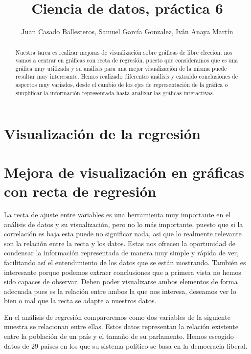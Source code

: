 \documentclass [a4paper] {article}
\title{Ciencia de datos, práctica 6}
\author{Juan Casado Ballesteros, Samuel García Gonzalez, Iván Anaya Martín}
\begin{document}
\maketitle

\begin{abstract}
Nuestra tarea es realizar mejoras de visualización sobre gráficas de libre elección. nos vamos a centrar en gráficas con recta de regresión, puesto 
que consideramos que es una gráfica muy utilizada y su análisis para una mejor visualización de la misma puede resultar muy interesante. 
Hemos realizado diferentes análisis y extraido conclusiones de aspectos muy variados, desde el cambio de los ejes de representación de la gráfica o 
simplificar la información representada hasta analizar las gráficas interactivas.

\end{abstract}

\newpage
\tableofcontents


\newpage
\section{Visualización de la regresión}


\section{Mejora de visualización en gráficas con recta de regresión}
La recta de ajuste entre variables es una herramienta muy importante en el análisis de datos y su visualización, pero no lo más importante, puesto que 
si la correlación es baja esta puede no significar nada, asi que lo realmente relevante son la relación entre la recta y los datos. 
Estas nos ofrecen la oportunidad de condensar la información representada de manera muy simple y rápida de ver, facilitando así 
el entendimiento de los datos que se están mostrando. También es interesante porque podemos extraer conclusiones que 
a primera vista no hemos sido capaces de observar. 
Deben poder visualizarse ambos elementos de forma adecuada pues es la relación entre ambos la que nos interesa, deseamos ver lo bien o mal que la recta se adapte a nuestros datos.

En el análisis de regresión compareremos como dos variables de la siguiente muestra se relacionan entre ellas.
Estos datos representan la relación existente entre la población de un país y el tamaño de su parlamento. Hemos escogido datos de 29 países en los
que su sistema político se basa en la democracia liberal.
\end{document}
